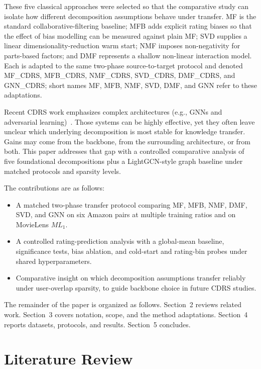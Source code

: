 \documentclass[pdflatex,sn-mathphys-num]{sn-jnl}%
\theoremstyle{thmstyleone}%
\theoremstyle{thmstyletwo}%
\theoremstyle{thmstylethree}%
\begin{document}
These five classical approaches were selected so that the comparative study can isolate how different decomposition assumptions behave under transfer. MF is the standard collaborative-filtering baseline; MFB adds explicit rating biases so that the effect of bias modelling can be measured against plain MF; SVD supplies a linear dimensionality-reduction warm start; NMF imposes non-negativity for parts-based factors; and DMF represents a shallow non-linear interaction model. Each is adapted to the same two-phase source-to-target protocol and denoted MF\_CDRS, MFB\_CDRS, NMF\_CDRS, SVD\_CDRS, DMF\_CDRS, and GNN\_CDRS; short names MF, MFB, NMF, SVD, DMF, and GNN refer to these adaptations.

Recent CDRS work emphasizes complex architectures (e.g., GNNs and adversarial learning)~\cite{kong2024dadin, ma2024triple, su2024cross, li2022adversarial, wang2025mf, zhao2025cross, zhu2025mimnet, duan2025dynamic, gao2025disentangled, chen2025recurrent, wang2025hierarchical}. Those systems can be highly effective, yet they often leave unclear which underlying decomposition is most stable for knowledge transfer. Gains may come from the backbone, from the surrounding architecture, or from both. This paper addresses that gap with a controlled comparative analysis of five foundational decompositions plus a LightGCN-style graph baseline under matched protocols and sparsity levels.

The contributions are as follows:
\begin{itemize}
    \item[-] A matched two-phase transfer protocol comparing MF, MFB, NMF, DMF, SVD, and GNN on six Amazon pairs at multiple training ratios and on MovieLens $ML_1$.
    \item[-] A controlled rating-prediction analysis with a global-mean baseline, significance tests, bias ablation, and cold-start and rating-bin probes under shared hyperparameters.
    \item[-] Comparative insight on which decomposition assumptions transfer reliably under user-overlap sparsity, to guide backbone choice in future CDRS studies.
\end{itemize}

The remainder of the paper is organized as follows. Section~2 reviews related work. Section~3 covers notation, scope, and the method adaptations. Section~4 reports datasets, protocols, and results. Section~5 concludes.

\section{Literature Review}\label{sec2}
\end{document}
